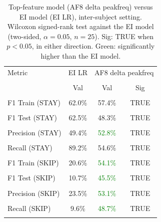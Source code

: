 \begin{table}[H]
\centering
\begin{tabular}{lccc}
\hline
Metric & EI LR & \multicolumn{2}{c}{AF8 delta peakfreq} \\\\
 & Val & Val & Sig \\\\
\hline
F1 Train (STAY) & 62.0\% & 57.4\% & TRUE \\\\
F1 Test (STAY) & 62.5\% & 48.3\% & TRUE \\\\
Precision (STAY) & 49.4\% & \textcolor{green}{52.8\%} & TRUE \\\\
Recall (STAY) & 89.2\% & 54.6\% & TRUE \\\\
F1 Train (SKIP) & 20.6\% & \textcolor{green}{54.1\%} & TRUE \\\\
F1 Test (SKIP) & 10.7\% & \textcolor{green}{45.5\%} & TRUE \\\\
Precision (SKIP) & 23.5\% & \textcolor{green}{53.1\%} & TRUE \\\\
Recall (SKIP) & 9.6\% & \textcolor{green}{48.7\%} & TRUE \\\\
\hline
\end{tabular}
\caption{Top-feature model (AF8 delta peakfreq) versus EI model (EI LR), inter-subject setting. Wilcoxon signed-rank test against the EI model (two-sided, $\alpha=0.05$, $n=25$). Sig: TRUE when $p<0.05$, in either direction. Green: significantly higher than the EI model.}
\label{tab:metrics_5_inter_2}
\end{table}